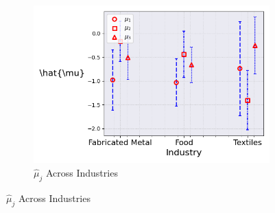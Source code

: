 \documentclass{article}
\begin{document}
\begin{figure}[ht!]
\begin{subfigure}[t]{0.32\textwidth}
        \centering
        \includegraphics[width=\textwidth]{figure/stationary_mixture_kmshare_ciiu_mubar_across_industries_m3.png}
        \caption{$\hat{\mu}_j$ Across Industries}
    \end{subfigure}


\end{figure}
\end{document}

